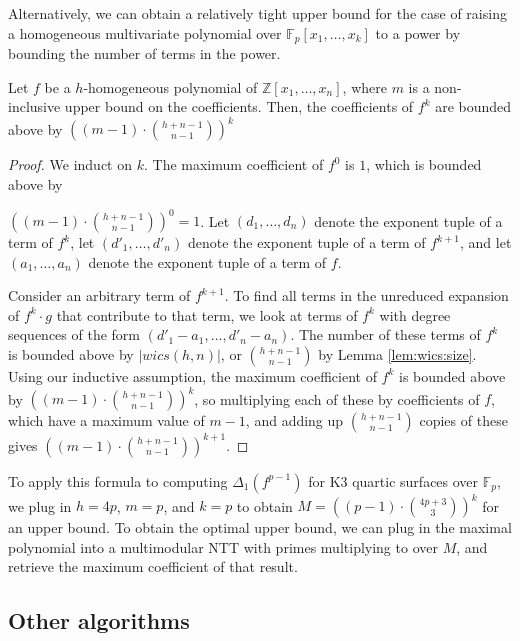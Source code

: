 Alternatively, we can obtain a relatively tight upper 
bound for the case of raising a homogeneous multivariate 
polynomial over $\mathbb{F}_p[x_1, \dots , x_k]$ to a power
by bounding the number of terms in the power. 

\begin{thm}
    Let $f$ be a $h$-homogeneous polynomial of $\mathbb{Z}[x_1, \dots, x_n]$, where $m$ is a non-inclusive upper bound on the coefficients. Then, the coefficients of $f ^ k$ are bounded above by $\left((m - 1) \cdot \binom{h + n - 1}{n - 1}\right)^ k$
\end{thm}

\begin{proof}
    We induct on $k$. The maximum coefficient 
    of $f^0$ is $1$, which is bounded above by 
    
    \noindent$\left((m - 1) \cdot \binom{h + n - 1}{n - 1}\right)^ 0 = 1$.
    Let $(d_1, \dots , d_n)$ denote the exponent 
    tuple of a term of $f^k$, let $(d'_1, \dots , d'_n)$ 
    denote the exponent tuple of a term of 
    $f^{k + 1}$, and let $(a_1, \dots , a_n)$ 
    denote the exponent tuple of a term of $f$.

    Consider an arbitrary term of $f^{k + 1}$. 
    To find all terms in the unreduced 
    expansion of $f^k \cdot g$ that contribute 
    to that term, we look at 
    terms of $f^k$ with degree sequences of 
    the form $(d'_1 - a_1, \dots , d'_n - a_n)$. 
    The number of these terms of $f^k$ is bounded 
    above by $|wics(h, n)|$, or $\binom{h + n - 1}{n - 1}$ 
    by Lemma \ref{lem:wics:size}. Using our 
    inductive assumption, the maximum coefficient 
    of $f^k$ is bounded above by 
    $\left((m - 1) \cdot \binom{h + n - 1}{n - 1}\right)^ k$, 
    so multiplying each of these by coefficients 
    of $f$, which have a maximum value of 
    $m - 1$, and adding up $\binom{h + n - 1}{n - 1}$ 
    copies of these gives 
    $\left((m - 1) \cdot \binom{h + n - 1}{n - 1}\right)^{k + 1}$.
\end{proof}

To apply this formula to computing $\Delta_1(f^{p - 1})$ for K3 
quartic surfaces over $\mathbb{F}_p$, we plug in $h = 4p$, $m = p$, 
and $k = p$ to obtain $M = \left((p - 1) \cdot \binom{4p + 3}{3}\right)^ k$
for an upper bound. To obtain the optimal upper bound, we can plug in the
maximal polynomial into a multimodular NTT with primes multiplying to over $M$,
and retrieve the maximum coefficient of that result.

\subsection{Other algorithms} \label{sec:poly:other}

